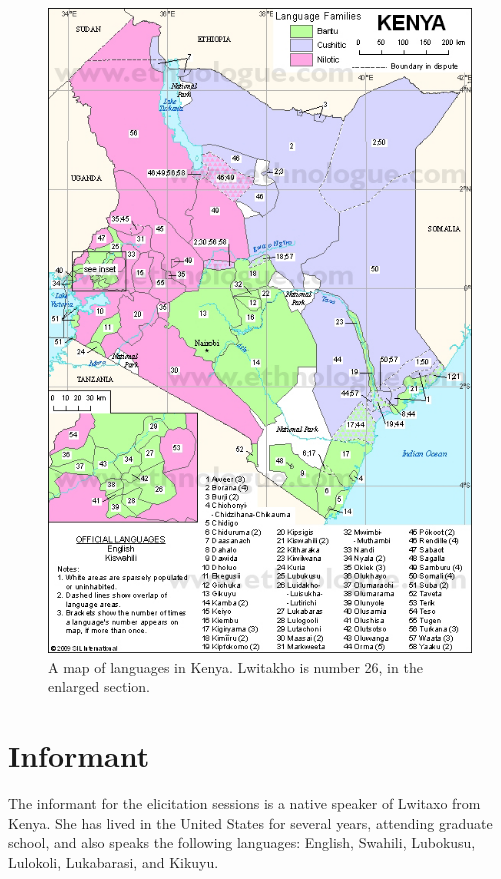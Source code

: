 \begin{figure}[p] \label{fig:map}
\caption{A map of languages in Kenya.  Lwitakho is number 26, in the enlarged section.}
\centering
\includegraphics[width=.9\linewidth]{ken_eth}
\end{figure}

\section{Informant}
The informant for the elicitation sessions is a native speaker of Lwitaxo from Kenya.  She has lived in the United States for several years, attending graduate school, and also speaks the following languages: English, Swahili, Lubokusu, Lulokoli, Lukabarasi, and Kikuyu.
